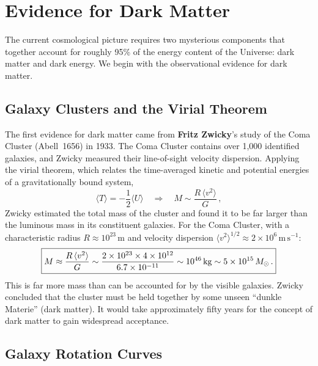 \section{Evidence for Dark Matter}
\label{sec:dark_matter_evidence}

The current cosmological picture requires two mysterious components that together account for roughly 95\% of the energy content of the Universe: dark matter and dark energy. We begin with the observational evidence for dark matter.

\subsection*{Galaxy Clusters and the Virial Theorem}

The first evidence for dark matter came from \textbf{Fritz Zwicky}'s study of the Coma Cluster (Abell~1656) in 1933. The Coma Cluster contains over 1{,}000 identified galaxies, and Zwicky measured their line-of-sight velocity dispersion. Applying the virial theorem, which relates the time-averaged kinetic and potential energies of a gravitationally bound system,
\begin{equation}
    \langle T \rangle = -\frac{1}{2}\langle U \rangle \quad\Longrightarrow\quad M \sim \frac{R\,\langle v^2\rangle}{G}\,,
\label{eq:virial}
\end{equation}
Zwicky estimated the total mass of the cluster and found it to be far larger than the luminous mass in its constituent galaxies. For the Coma Cluster, with a characteristic radius $R\approx 10^{23}\,\mathrm{m}$ and velocity dispersion $\langle v^2\rangle^{1/2}\approx 2\times 10^{6}\,\mathrm{m\,s^{-1}}$:
\begin{equation}
\boxed{M \approx \frac{R\,\langle v^2\rangle}{G} \sim \frac{2\times 10^{23}\times 4\times 10^{12}}{6.7\times 10^{-11}} \sim 10^{46}\,\mathrm{kg} \sim 5\times 10^{15}\,M_{\odot}\,.}
\label{eq:coma_mass}
\end{equation}
This is far more mass than can be accounted for by the visible galaxies. Zwicky concluded that the cluster must be held together by some unseen ``dunkle Materie'' (dark matter). It would take approximately fifty years for the concept of dark matter to gain widespread acceptance.

\subsection*{Galaxy Rotation Curves}

